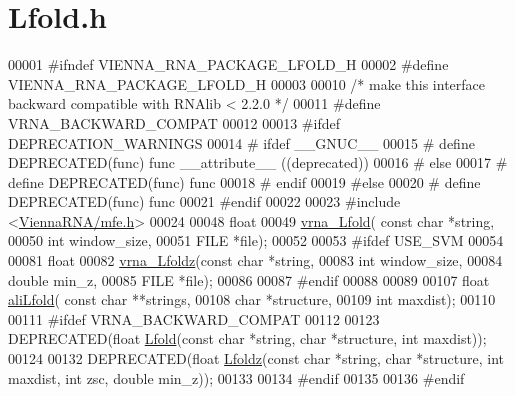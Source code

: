 \hypertarget{Lfold_8h_source}{}\section{Lfold.\+h}
\label{Lfold_8h_source}

\begin{DoxyCode}
00001 \textcolor{preprocessor}{#ifndef VIENNA\_RNA\_PACKAGE\_LFOLD\_H}
00002 \textcolor{preprocessor}{#define VIENNA\_RNA\_PACKAGE\_LFOLD\_H}
00003 
00010 \textcolor{comment}{/* make this interface backward compatible with RNAlib < 2.2.0 */}
00011 \textcolor{preprocessor}{#define VRNA\_BACKWARD\_COMPAT}
00012 
00013 \textcolor{preprocessor}{#ifdef DEPRECATION\_WARNINGS}
00014 \textcolor{preprocessor}{# ifdef \_\_GNUC\_\_}
00015 \textcolor{preprocessor}{#  define DEPRECATED(func) func \_\_attribute\_\_ ((deprecated))}
00016 \textcolor{preprocessor}{# else}
00017 \textcolor{preprocessor}{#  define DEPRECATED(func) func}
00018 \textcolor{preprocessor}{# endif}
00019 \textcolor{preprocessor}{#else}
00020 \textcolor{preprocessor}{# define DEPRECATED(func) func}
00021 \textcolor{preprocessor}{#endif}
00022 
00023 \textcolor{preprocessor}{#include <\hyperlink{mfe_8h}{ViennaRNA/mfe.h}>}
00024 
00048 \textcolor{keywordtype}{float}
00049 \hyperlink{group__local__mfe__fold_ga4918cce52bf69c1913cda503b2ac75d8}{vrna\_Lfold}( \textcolor{keyword}{const} \textcolor{keywordtype}{char} *\textcolor{keywordtype}{string},
00050             \textcolor{keywordtype}{int} window\_size,
00051             FILE  *file);
00052 
00053 \textcolor{preprocessor}{#ifdef USE\_SVM}
00054 
00081 \textcolor{keywordtype}{float}
00082 \hyperlink{group__local__mfe__fold_ga27fddda5fc63eb49c861e38845fc34b4}{vrna\_Lfoldz}(\textcolor{keyword}{const} \textcolor{keywordtype}{char} *\textcolor{keywordtype}{string},
00083             \textcolor{keywordtype}{int} window\_size,
00084             \textcolor{keywordtype}{double} min\_z,
00085             FILE *file);
00086 
00087 \textcolor{preprocessor}{#endif}
00088 
00089 
00107 \textcolor{keywordtype}{float} \hyperlink{group__local__consensus__fold_ga20a173a3cdb83f5d1778e36c1a6b1f2b}{aliLfold}( \textcolor{keyword}{const} \textcolor{keywordtype}{char} **strings,
00108                 \textcolor{keywordtype}{char} *structure,
00109                 \textcolor{keywordtype}{int} maxdist);
00110 
00111 \textcolor{preprocessor}{#ifdef  VRNA\_BACKWARD\_COMPAT}
00112 
00123 DEPRECATED(\textcolor{keywordtype}{float} \hyperlink{group__local__mfe__fold_ga16e5a70e60835bb969eaecbe6482f1be}{Lfold}(\textcolor{keyword}{const} \textcolor{keywordtype}{char} *\textcolor{keywordtype}{string}, \textcolor{keywordtype}{char} *structure, \textcolor{keywordtype}{int} maxdist));
00124 
00132 DEPRECATED(\textcolor{keywordtype}{float} \hyperlink{group__local__mfe__fold_gab6d79eecc180f586679f7b85cce5cbe9}{Lfoldz}(\textcolor{keyword}{const} \textcolor{keywordtype}{char} *\textcolor{keywordtype}{string}, \textcolor{keywordtype}{char} *structure, \textcolor{keywordtype}{int} maxdist, \textcolor{keywordtype}{int} zsc, \textcolor{keywordtype}{double} min\_z));
00133 
00134 \textcolor{preprocessor}{#endif}
00135 
00136 \textcolor{preprocessor}{#endif}
\end{DoxyCode}

